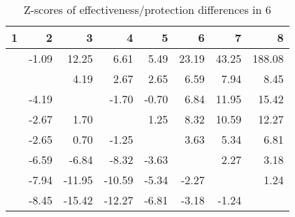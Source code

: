 \begin{table}[ht]
\centering
\begin{tabular}{rrrrrrrr}
  \hline
1 & 2 & 3 & 4 & 5 & 6 & 7 & 8 \\ 
  \hline
 & -1.09 & 12.25 & 6.61 & 5.49 & 23.19 & 43.25 & 188.08 \\ 
   &  & 4.19 & 2.67 & 2.65 & 6.59 & 7.94 & 8.45 \\ 
   & -4.19 &  & -1.70 & -0.70 & 6.84 & 11.95 & 15.42 \\ 
   & -2.67 & 1.70 &  & 1.25 & 8.32 & 10.59 & 12.27 \\ 
   & -2.65 & 0.70 & -1.25 &  & 3.63 & 5.34 & 6.81 \\ 
   & -6.59 & -6.84 & -8.32 & -3.63 &  & 2.27 & 3.18 \\ 
   & -7.94 & -11.95 & -10.59 & -5.34 & -2.27 &  & 1.24 \\ 
   & -8.45 & -15.42 & -12.27 & -6.81 & -3.18 & -1.24 &  \\ 
   \hline
\end{tabular}
\caption{Z-scores of effectiveness/protection differences in  6} 
\end{table}
